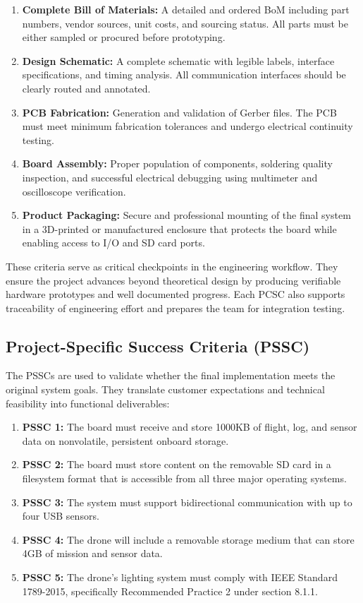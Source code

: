 \documentclass[12pt]{article}
\begin{document}
\begin{enumerate}
    \item \textbf{Complete Bill of Materials:} A detailed and ordered BoM including part numbers, vendor sources, unit costs, and sourcing status. All parts must be either sampled or procured before prototyping.
    \item \textbf{Design Schematic:} A complete schematic with legible labels, interface specifications, and timing analysis. All communication interfaces should be clearly routed and annotated.
    \item \textbf{PCB Fabrication:} Generation and validation of Gerber files. The PCB must meet minimum fabrication tolerances and undergo electrical continuity testing.
    \item \textbf{Board Assembly:} Proper population of components, soldering quality inspection, and successful electrical debugging using multimeter and oscilloscope verification.
    \item \textbf{Product Packaging:} Secure and professional mounting of the final system in a 3D-printed or manufactured enclosure that protects the board while enabling access to I/O and SD card ports.
\end{enumerate}

\par These criteria serve as critical checkpoints in the engineering workflow. They ensure the project advances beyond theoretical design by producing verifiable hardware prototypes and well documented progress. Each PCSC also supports traceability of engineering effort and prepares the team for integration testing.

\subsection{Project-Specific Success Criteria (PSSC)}

\par The PSSCs are used to validate whether the final implementation meets the original system goals. They translate customer expectations and technical feasibility into functional deliverables:

\begin{enumerate}
    \item \textbf{PSSC 1:} The board must receive and store 1000KB of flight, log, and sensor data on nonvolatile, persistent onboard storage.
    \item \textbf{PSSC 2:} The board must store content on the removable SD card in a filesystem format that is accessible from all three major operating systems.
    \item \textbf{PSSC 3:} The system must support bidirectional communication with up to four USB sensors.
    \item \textbf{PSSC 4:} The drone will include a removable storage medium that can store 4GB of mission and sensor data.
    \item \textbf{PSSC 5:} The drone’s lighting system must comply with IEEE Standard 1789-2015, specifically Recommended Practice 2 under section 8.1.1.
\end{enumerate}
\end{document}
